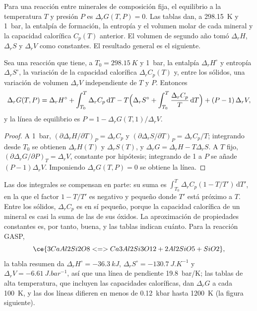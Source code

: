 Para una reacción entre minerales de composición fija, el equilibrio a la
temperatura $T$ y presión $P$ es $\Delta_rG(T, P) = 0$. Las tablas dan, a
\qty{298.15}{K} y \qty{1}{bar}, la entalpía de formación, la entropía y
el volumen molar de cada mineral y la capacidad calorífica $C_p(T)$ anterior. El
volumen de segundo año tomó $\Delta_rH$, $\Delta_rS$ y $\Delta_rV$ como constantes. El
resultado general es el siguiente.

\begin{theorem}\label{thm:b3:petrological-thermodynamics:dg}
Sea una reacción que tiene, a $T_0 = \qty{298.15}{K}$ y \qty{1}{bar}, la
entalpía $\Delta_rH^\circ$ y entropía $\Delta_rS^\circ$, la variación de la capacidad calorífica
$\Delta_rC_p(T)$ y, entre los sólidos, una variación de volumen $\Delta_rV$
independiente de $T$ y $P$. Entonces
\[
  \Delta_rG(T, P) = \Delta_rH^\circ + \int_{T_0}^{T}\Delta_rC_p\,\mathrm dT
  - T\Bigl(\Delta_rS^\circ + \int_{T_0}^{T}\frac{\Delta_rC_p}{T}\,\mathrm dT\Bigr)
  + (P - 1)\,\Delta_rV ,
\]
y la línea de equilibrio es $P = 1 - \Delta_rG(T, 1)/\Delta_rV$.
\end{theorem}

\begin{proof}
A \qty{1}{bar}, $(\partial\Delta_rH/\partial T)_P = \Delta_rC_p$ y
$(\partial\Delta_rS/\partial T)_P = \Delta_rC_p/T$; integrando desde $T_0$
se obtienen $\Delta_rH(T)$ y $\Delta_rS(T)$, y $\Delta_rG = \Delta_rH -
T\Delta_rS$. A $T$ fijo, $(\partial\Delta_rG/\partial P)_T = \Delta_rV$,
constante por hipótesis; integrando de 1 a $P$ se añade $(P - 1)\Delta_rV$.
Imponiendo $\Delta_rG(T, P) = 0$ se obtiene la línea.
\end{proof}

Las dos integrales se compensan en parte: su suma es $\int_{T_0}^T\Delta_rC_p(1 -
T/T')\,\mathrm dT'$, en la que el factor $1 - T/T'$ es negativo y pequeño
donde $T'$ está próximo a $T$. Entre los sólidos, $\Delta_rC_p$ es en sí pequeño,
porque la capacidad calorífica de un mineral es casi la suma de las de sus
óxidos. La aproximación de propiedades constantes es, por tanto, buena, y las
tablas indican cuánto. Para la reacción GASP,
\[
  \ce{3 CaAl2Si2O8 <=> Ca3Al2Si3O12 + 2 Al2SiO5 + SiO2},
\]
la tabla resumen da $\Delta_rH^\circ = \qty{-36.3}{kJ}$,
$\Delta_rS^\circ = \qty{-130.7}{J.K^{-1}}$ y $\Delta_rV =
\qty{-6.61}{J.bar^{-1}}$, así que una línea de pendiente \qty{19.8}{bar/K}; las
tablas de alta temperatura, que incluyen las capacidades caloríficas, dan
$\Delta_rG$ a cada \qty{100}{K}, y las dos líneas difieren en menos de
\qty{0.12}{kbar} hasta \qty{1200}{K} (la figura siguiente).

